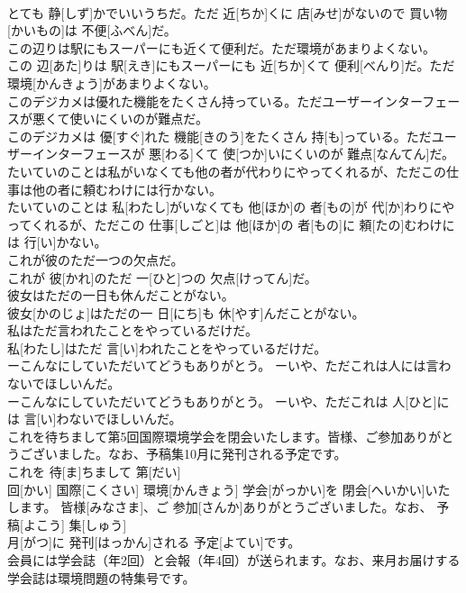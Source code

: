 \documentclass[8pt]{extreport}
\begin{document}
\begin{CJK}{UTF8}{min}
\\	とても 静[しず]かでいいうちだ。ただ 近[ちか]くに 店[みせ]がないので 買い物[かいもの]は 不便[ふべん]だ。
\\	この辺りは駅にもスーパーにも近くて便利だ。ただ環境があまりよくない。	
\\	この 辺[あた]りは 駅[えき]にもスーパーにも 近[ちか]くて 便利[べんり]だ。ただ 環境[かんきょう]があまりよくない。
\\	このデジカメは優れた機能をたくさん持っている。ただユーザーインターフェースが悪くて使いにくいのが難点だ。	
\\	このデジカメは 優[すぐ]れた 機能[きのう]をたくさん 持[も]っている。ただユーザーインターフェースが 悪[わる]くて 使[つか]いにくいのが 難点[なんてん]だ。
\\	たいていのことは私がいなくても他の者が代わりにやってくれるが、ただこの仕事は他の者に頼むわけには行かない。	
\\	たいていのことは 私[わたし]がいなくても 他[ほか]の 者[もの]が 代[か]わりにやってくれるが、ただこの 仕事[しごと]は 他[ほか]の 者[もの]に 頼[たの]むわけには 行[い]かない。
\\	これが彼のただ一つの欠点だ。	
\\	これが 彼[かれ]のただ 一[ひと]つの 欠点[けってん]だ。
\\	彼女はただの一日も休んだことがない。	
\\	彼女[かのじょ]はただの一 日[にち]も 休[やす]んだことがない。
\\	私はただ言われたことをやっているだけだ。	
\\	私[わたし]はただ 言[い]われたことをやっているだけだ。
\\	ーこんなにしていただいてどうもありがとう。 ーいや、ただこれは人には言わないでほしいんだ。	
\\	ーこんなにしていただいてどうもありがとう。 ーいや、ただこれは 人[ひと]には 言[い]わないでほしいんだ。
\\	これを待ちまして第5回国際環境学会を閉会いたします。皆様、ご参加ありがとうございました。なお、予稿集10月に発刊される予定です。	
\\	これを 待[ま]ちまして 第[だい] 
\\	回[かい] 国際[こくさい] 環境[かんきょう] 学会[がっかい]を 閉会[へいかい]いたします。 皆様[みなさま]、ご 参加[さんか]ありがとうございました。なお、 予稿[よこう] 集[しゅう] 
\\	月[がつ]に 発刊[はっかん]される 予定[よてい]です。
\\	会員には学会誌（年2回）と会報（年4回）が送られます。なお、来月お届けする学会誌は環境問題の特集号です。	

\end{CJK}
\end{document}
